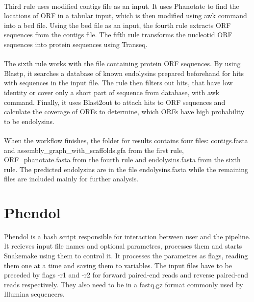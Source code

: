 \paragraph*{}
Third rule uses modified contigs file as an input. It uses Phanotate to find the locations of ORF in a tabular input, which is then modified using awk command into a bed file. Using the bed file as an input, the fourth rule extracts ORF sequences from the contigs file. The fifth rule transforms the nucleotid ORF sequences into protein sequences using Transeq.
\paragraph*{}
The sixth rule works with the file containing protein ORF sequences. By using Blastp, it searches a database of known endolysins prepared beforehand for hits with sequences in the input file. The rule then filters out hits, that have low identity or cover only a short part of sequence from database, with awk command. Finally, it uses Blast2out to attach hits to ORF sequences and calculate the coverage of ORFs to determine, which ORFs have high probability to be endolysins.
\paragraph*{}
When the workflow finishes, the folder for results contains four files: contigs.fasta and assembly\_graph\_with\_scaffolds.gfa from the first rule, ORF\_phanotate.fasta from the fourth rule and endolysins.fasta from the sixth rule. The predicted endolysins are in the file endolysins.fasta while the remaining files are included mainly for further analysis.

\section{Phendol}
\paragraph*{}
Phendol is a bash script responsible for interaction between user and the pipeline. It recieves input file names and optional parametres, processes them and starts Snakemake using them to control it. It processes the parametres as flags, reading them one at a time and saving them to variables. The input files have to be preceded by flags -r1 and -r2 for forward paired-end reads and reverse paired-end reads respectively. They also need to be in a fastq.gz format commonly used by Illumina sequencers.
